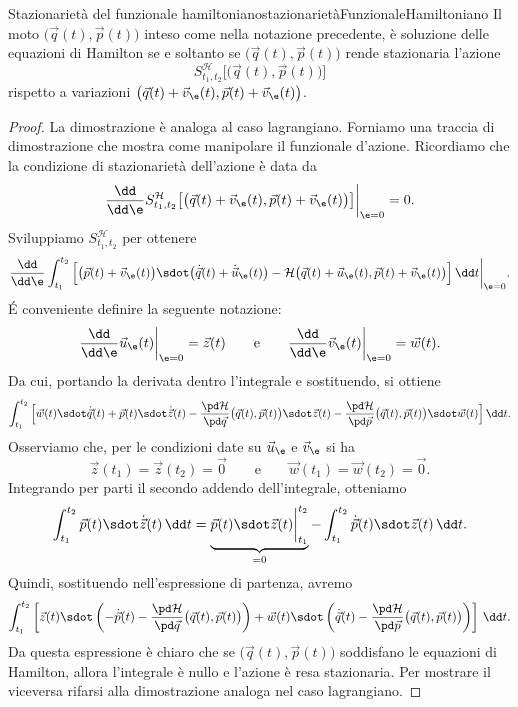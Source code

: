 \begin{teor}{Stazionarietà del funzionale hamiltoniano}{stazionarietàFunzionaleHamiltoniano}
	Il moto \(\big(\vec{q}(t),\vec{p}(t)\big)\) inteso come nella notazione precedente, è soluzione delle equazioni di Hamilton se e soltanto se \(\big(\vec{q}(t),\vec{p}(t)\big)\) rende stazionaria l'azione
	\[
		S_{t_1,t_2}^{\mathcal{H}}\big[\big(\vec{q}(t),\vec{p}(t)\big)\big]
	\]
	rispetto a variazioni \(\big(\vec{q}(t)+\vec{v}_\e(t),\vec{p}(t)+\vec{v}_\e(t)\big)\).
\end{teor}

\begin{proof}
	La dimostrazione è analoga al caso lagrangiano. Forniamo una traccia di dimostrazione che mostra come manipolare il funzionale d'azione.
	Ricordiamo che la condizione di stazionarietà dell'azione è data da
	\[
		\frac{\dd}{\dd\e} S_{t_1,t_2}^{\mathcal{H}}\big[\big(\vec{q}(t)+\vec{v}_\e(t),\vec{p}(t)+\vec{v}_\e(t)\big)\big]\bigg|_{\e = 0} = 0.
	\]
	Sviluppiamo \(S_{t_1,t_2}^{\mathcal{H}}\) per ottenere
	\[
		\frac{\dd}{\dd\e}\int_{t_1}^{t_2}\Big[\big(\vec{p}(t)+\vec{v}_\e(t)\big) \sdot \big(\dot{\vec{q}}(t)+\dot{\vec{u}}_\e(t)\big) - \mathcal{H}\big(\vec{q}(t)+\vec{u}_\e(t),\vec{p}(t)+\vec{v}_\e(t)\big)\Big]\,\dd t \bigg|_{\e=0}.
	\]
	\'E conveniente definire la seguente notazione:
	\[
		\frac{\dd}{\dd\e}\vec{u}_\e(t)\bigg|_{\e=0} = \vec{z}(t) \qquad\text{e}\qquad \frac{\dd}{\dd\e}\vec{v}_\e(t)\bigg|_{\e=0}=\vec{w}(t).
	\]
	Da cui, portando la derivata dentro l'integrale e sostituendo, si ottiene
	\[
		\int_{t_1}^{t_2}\Big[\vec{w}(t) \sdot \dot{\vec{q}}(t)+\vec{p}(t)\sdot\dot{\vec{z}}(t)-\frac{\pd\mathcal{H}}{\pd\vec{q}}\big(\vec{q}(t),\vec{p}(t)\big)\sdot\vec{z}(t) - \frac{\pd\mathcal{H}}{\pd\vec{p}}\big(\vec{q}(t),\vec{p}(t)\big) \sdot \vec{w}(t)\Big]\,\dd t.
	\]
	Osserviamo che, per le condizioni date su \(\vec{u}_\e\) e \(\vec{v}_\e\) si ha
	\[
		\vec{z}(t_1) = \vec{z}(t_2) = \vec{0} \qquad\text{e}\qquad \vec{w}(t_1)=\vec{w}(t_2) = \vec{0}.
	\]
	Integrando per parti il secondo addendo dell'integrale, otteniamo
	\[
		\int_{t_1}^{t_2}\vec{p}(t)\sdot\dot{\vec{z}}(t)\,\dd t = \underbrace{\vec{p}(t)\sdot\vec{z}(t)\bigg|_{t_1}^{t_2}}_{=0} - \int_{t_1}^{t_2} \dot{\vec{p}}(t)\sdot \vec{z}(t)\,\dd t.
	\]
	Quindi, sostituendo nell'espressione di partenza, avremo
	\[
		\int_{t_1}^{t_2}\left[\vec{z}(t)\sdot\left(-\dot{\vec{p}}(t)-\frac{\pd\mathcal{H}}{\pd\vec{q}}\big(\vec{q}(t),\vec{p}(t)\big)\right) + \vec{w}(t) \sdot \left(\dot{\vec{q}}(t) - \frac{\pd\mathcal{H}}{\pd\vec{p}}\big(\vec{q}(t),\vec{p}(t)\big)\right)\right]\,\dd t.
	\]
	Da questa espressione è chiaro che se \(\big(\vec{q}(t),\vec{p}(t)\big)\) soddisfano le equazioni di Hamilton, allora l'integrale è nullo e l'azione è resa stazionaria.
	Per mostrare il viceversa rifarsi alla dimostrazione analoga nel caso lagrangiano.
\end{proof}

